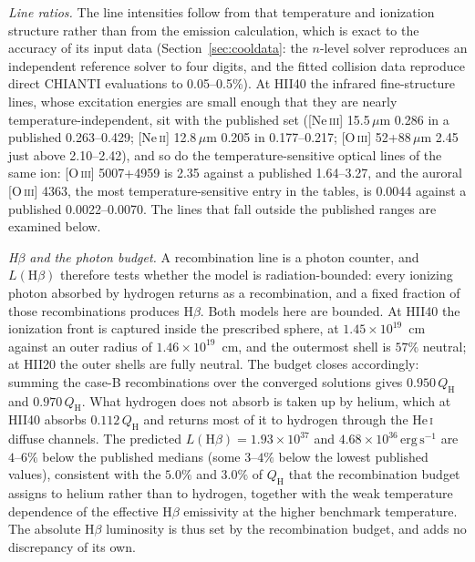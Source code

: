 \documentclass[twocolumn,linenumbers]{aastex702}
\newcommand{\HeI}{He\,\textsc{i}}
\newcommand{\QH}{Q_{\mathrm{H}}}
\begin{document}
\emph{Line ratios.}  The line intensities follow from that temperature and
ionization structure rather than from the emission calculation, which is
exact to the accuracy of its input data (Section~\ref{sec:cooldata}: the
$n$-level solver reproduces an independent reference solver to four digits,
and the fitted collision data reproduce direct CHIANTI evaluations to
0.05--0.5\%).  At HII40 the infrared fine-structure lines, whose excitation
energies are small enough that they are nearly temperature-independent, sit
with the published set ([Ne\,\textsc{iii}] 15.5\,$\mu$m 0.286 in a
published 0.263--0.429; [Ne\,\textsc{ii}] 12.8\,$\mu$m 0.205 in
0.177--0.217; [O\,\textsc{iii}] 52+88\,$\mu$m 2.45 just above 2.10--2.42),
and so do the temperature-sensitive optical lines of the same ion:
[O\,\textsc{iii}] 5007+4959 is 2.35 against a published 1.64--3.27, and the
auroral [O\,\textsc{iii}] 4363, the most temperature-sensitive entry in the
tables, is 0.0044 against a published 0.0022--0.0070.  The lines that fall
outside the published ranges are examined below.

\emph{H$\beta$ and the photon budget.}  A recombination line is a photon
counter, and $L(\mathrm{H}\beta)$ therefore tests whether the model is
radiation-bounded: every ionizing photon absorbed by hydrogen returns as a
recombination, and a fixed fraction of those recombinations produces
H$\beta$.  Both models here are bounded.  At HII40 the ionization front is
captured inside the prescribed sphere, at $1.45\times10^{19}$~cm against an
outer radius of $1.46\times10^{19}$~cm, and the outermost shell is $57\%$
neutral; at HII20 the outer shells are fully neutral.  The budget closes
accordingly: summing the case-B recombinations over the converged solutions
gives $0.950\,\QH$ and $0.970\,\QH$.  What hydrogen does not absorb is
taken up by helium, which at HII40 absorbs $0.112\,\QH$ and returns most of
it to hydrogen through the \HeI{} diffuse channels.  The predicted
$L(\mathrm{H}\beta) = 1.93\times10^{37}$ and
$4.68\times10^{36}\,\mathrm{erg\,s^{-1}}$ are $4$--$6\%$ below the
published medians (some $3$--$4\%$ below the lowest published values),
consistent with the $5.0\%$ and $3.0\%$ of $\QH$ that the recombination
budget assigns to helium rather than to hydrogen, together with the weak
temperature dependence of the effective H$\beta$ emissivity at the higher
benchmark temperature.  The absolute H$\beta$ luminosity is thus set by the
recombination budget, and adds no discrepancy of its own.
\end{document}
